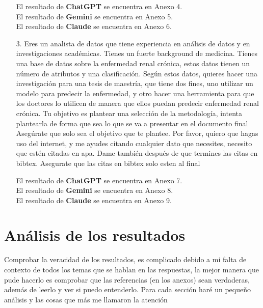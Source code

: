 \documentclass{article}
\begin{document}
\begin{itemize}
El resultado de \textbf{ChatGPT} se encuentra en Anexo 4.\\
El resultado de \textbf{Gemini} se encuentra en Anexo 5.\\
El resultado de \textbf{Claude} se encuentra en Anexo 6.
    \item[3.]
Eres un analista de datos que tiene experiencia en análisis
de datos y en investigaciones académicas. Tienes un fuerte
background de medicina. Tienes una base de datos sobre la
enfermedad renal crónica, estos datos tienen un número de
atributos y una clasificación. Según estos datos, quieres
hacer una investigación para una tesis de maestría, que
tiene dos fines, uno utilizar un modelo para predecir la
enfermedad, y otro hacer una herramienta para que los
doctores lo utilicen de manera que ellos puedan predecir
enfermedad renal crónica. Tu objetivo es plantear una selección de la metodología, intenta plantearla de forma que sea lo que se va a presentar en el documento final
Asegúrate que solo sea el objetivo que te plantee. Por
favor, quiero que hagas uso del internet, y me
ayudes citando cualquier dato que necesites, necesito que
estén citadas en apa. Dame también después de que termines
las citas en bibtex. Asegurate que las citas en bibtex solo esten al final

El resultado de \textbf{ChatGPT} se encuentra en Anexo 7.\\
El resultado de \textbf{Gemini} se encuentra en Anexo 8.\\
El resultado de \textbf{Claude} se encuentra en Anexo 9.
\end{itemize}
\section{Análisis de los resultados}
Comprobar la veracidad de los resultados, es
complicado debido a mi falta de contexto de todos los temas que se hablan en las respuestas, la mejor manera que pude hacerlo es comprobar
que las referencias (en los anexos) sean verdaderas, además de leerlo y ver si puedo entenderlo.
Para cada sección haré un pequeño análisis y las cosas que
más me llamaron la atención
\end{document}
